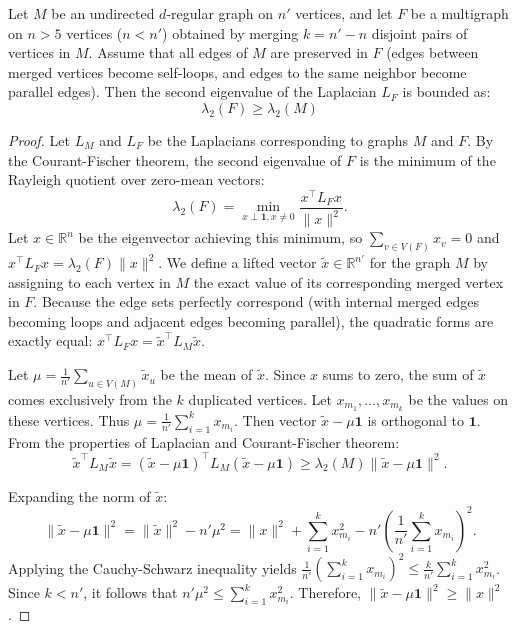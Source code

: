\documentclass[a4paper,USenglish,cleveref, autoref, thm-restate]{lipics-v2021}
\begin{document}
\begin{lemma}\label{lem:vertex_merge}
Let $M$ be an undirected $d$-regular graph on $n'$ vertices, and let $F$ be a multigraph on $n>5$ vertices ($n < n'$) obtained by merging $k = n' - n$ disjoint pairs of vertices in $M$. Assume that all edges of $M$ are preserved in $F$ (edges between merged vertices become self-loops, and edges to the same neighbor become parallel edges). Then the second eigenvalue of the Laplacian $L_F$ is bounded as:
\begin{equation}
    \lambda_2(F) \geq \lambda_2(M)
\end{equation}
\end{lemma}

\begin{proof}
Let $L_M$ and $L_F$ be the Laplacians corresponding to graphs $M$ and $F$. By the Courant-Fischer theorem, the second eigenvalue of $F$ is the minimum of the Rayleigh quotient over zero-mean vectors:
\begin{equation}
    \lambda_2(F) = \min_{x \perp \mathbf{1}, x \neq 0} \frac{x^\top L_F x}{\|x\|^2}.
\end{equation}
Let $x \in \mathbb{R}^n$ be the eigenvector achieving this minimum, so $\sum_{v \in V(F)} x_v = 0$ and $x^\top L_F x = \lambda_2(F) \|x\|^2$.
We define a lifted vector $\tilde{x} \in \mathbb{R}^{n'}$ for the graph $M$ by assigning to each vertex in $M$ the exact value of its corresponding merged vertex in $F$. Because the edge sets perfectly correspond (with internal merged edges becoming loops and adjacent edges becoming parallel), the quadratic forms are exactly equal: $x^\top L_F x = \tilde{x}^\top L_M \tilde{x}$.

Let $\mu = \frac{1}{n'} \sum_{u \in V(M)} \tilde{x}_u$ be the mean of $\tilde{x}$.
Since $x$ sums to zero, the sum of $\tilde{x}$ comes exclusively from the $k$ duplicated vertices. Let $x_{m_1}, \ldots, x_{m_k}$ be the values on these vertices. Thus $\mu = \frac{1}{n'} \sum_{i=1}^k x_{m_i}$. Then vector $\tilde{x} - \mu \mathbf{1}$ is orthogonal to $\mathbf{1}$. From the properties of Laplacian and Courant-Fischer theorem:
\begin{equation}
    \tilde{x}^\top L_M \tilde{x} = (\tilde{x} - \mu \mathbf{1})^\top L_M (\tilde{x} - \mu \mathbf{1}) \ge \lambda_2(M) \|\tilde{x} - \mu\mathbf{1}\|^2.
\end{equation}

Expanding the norm of $\tilde{x}$:
\begin{equation}
    \|\tilde{x} - \mu\mathbf{1}\|^2 = \|\tilde{x}\|^2 - n'\mu^2 = \|x\|^2 + \sum_{i=1}^k x_{m_i}^2 - n'\left(\frac{1}{n'}\sum_{i=1}^k x_{m_i}\right)^2.
\end{equation}
Applying the Cauchy-Schwarz inequality yields $\frac{1}{n'}(\sum_{i=1}^k x_{m_i})^2 \leq \frac{k}{n'}\sum_{i=1}^k x_{m_i}^2$. Since $k < n'$, it follows that $n'\mu^2 \leq \sum_{i=1}^k x_{m_i}^2$. 
Therefore, $\|\tilde{x} - \mu\mathbf{1}\|^2 \geq \|x\|^2$. 


\end{proof}
\end{document}
